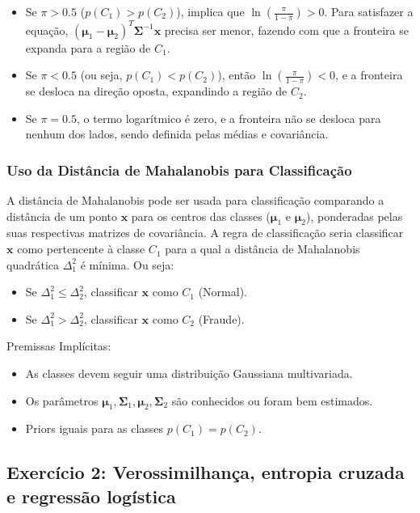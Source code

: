 \documentclass[conference]{IEEEtran}
\begin{document}
\begin{itemize}
    \item Se $\pi > 0.5$ ($p(C_1) > p(C_2)$), implica que $\ln \left(\frac{\pi}{1 - \pi}\right) > 0$. Para satisfazer a equação, $(\boldsymbol{\mu}_1 - \boldsymbol{\mu}_2)^T \boldsymbol{\Sigma}^{-1} \mathbf{x}$ precisa ser menor, fazendo com que a fronteira se expanda para a região de $C_1$.
    \item Se $\pi < 0.5$ (ou seja, $p(C_1) < p(C_2)$), então $\ln \left(\frac{\pi}{1 - \pi}\right) < 0$, e a fronteira se desloca na direção oposta, expandindo a região de $C_2$.
    \item Se $\pi = 0.5$, o termo logarítmico é zero, e a fronteira não se desloca para nenhum dos lados, sendo definida pelas médias e covariância.
\end{itemize}

\subsubsection{Uso da Distância de Mahalanobis para Classificação}
A distância de Mahalanobis pode ser usada para classificação comparando a distância de um ponto \(\mathbf{x}\) para os centros das classes (\(\boldsymbol{\mu}_1\) e \(\boldsymbol{\mu}_2\)), ponderadas pelas suas respectivas matrizes de covariância. A regra de classificação seria classificar \(\mathbf{x}\) como pertencente à classe \(C_1\) para a qual a distância de Mahalanobis quadrática \(\Delta_1^2\) é mínima. Ou seja:
\begin{itemize}
    \item Se \(\Delta_1^2 \leqslant \Delta_2^2\), classificar \(\mathbf{x}\) como \(C_1\) (Normal).
    \item Se \(\Delta_1^2 > \Delta_2^2\), classificar \(\mathbf{x}\) como \(C_2\) (Fraude).
\end{itemize}

Premissas Implícitas:
\begin{itemize}
    \item As classes devem seguir uma distribuição Gaussiana multivariada. 
    \item Os parâmetros $\boldsymbol{\mu}_1, \boldsymbol{\Sigma}_1, \boldsymbol{\mu}_2, \boldsymbol{\Sigma}_2$ são conhecidos ou foram bem estimados.
    \item Priors iguais para as classes \(p(C_1) = p(C_2)\).
\end{itemize}

\subsection{Exercício 2: Verossimilhança, entropia cruzada e regressão logística}
\label{subsec:ex2}
\end{document}
